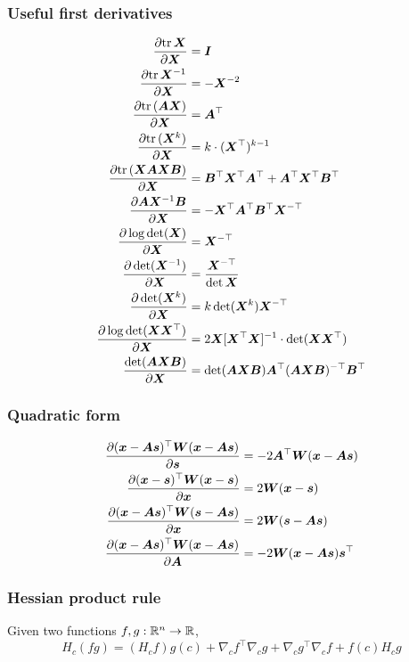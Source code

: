 \documentclass[10pt]{article}
\begin{document}
\subsubsection{Useful first derivatives}
\begin{align}
    \frac{\partial \mathrm{tr}\,{{\bm{X}}}}{\partial {\bm{X}}} &= {\bm{I}}  
\\
    \frac{\partial \mathrm{tr}\,{{\bm{X}}^{-1}}}{\partial {\bm{X}}} &= -{\bm{X}}^{-2} 
\\
\frac{\partial \mathrm{tr}\,({\bm{A}} {\bm{X}})}{\partial {\bm{X}}} &= {\bm{A}}^{\top}
\\
    \frac{\partial \mathrm{tr}\,( {\bm{X}}^k)}{\partial {\bm{X}}} &= {k \cdot ({\bm{X}}^{\top})^{k-1}}
\\
    \frac{\partial \mathrm{tr}\,( {\bm{X}} {\bm{A}} {\bm{X}} {\bm{B}})}{\partial {\bm{X}}} &= {\bm{B}}^{\top} {\bm{X}}^{\top} {\bm{A}}^{\top} + {\bm{A}}^{\top} {\bm{X}}^{\top} {\bm{B}}^{\top}
\\
\frac{\partial {\bm{A}} {\bm{X}}^{-1} {\bm{B}}}{\partial {\bm{X}}} &= - {\bm{X}}^{\top} {\bm{A}}^{\top} {\bm{B}}^{\top} {\bm{X}}^{-\top} 
\\ 
\frac{\partial \log \det ( {\bm{X}})}{\partial {\bm{X}}} &= {\bm{X}}^{- \top}
\\
    \frac{\partial \det({\bm{X}}^{-1})}{\partial {\bm{X}}} &= \frac{{\bm{X}}^{- \top}}{\det{{\bm{X}}}} 
\\ 
\frac{\partial \det({\bm{X}}^k)}{\partial {\bm{X}}} &= k \det({\bm{X}}^k) {\bm{X}}^{- \top} \\ 
\frac{\partial \log \det( {\bm{X}} {\bm{X}}^{\top})}{\partial {\bm{X}}} &= 2 {\bm{X}} [{\bm{X}}^{\top} {\bm{X}}]^{-1} \cdot \det({\bm{X}} {\bm{X}}^{\top}) 
\\ 
\frac{\det( {\bm{A}} {\bm{X}} {\bm{B}})}{\partial {\bm{X}}} &= \det({\bm{A}} {\bm{X}} {\bm{B}}) {\bm{A}}^{\top} ({\bm{A}} {\bm{X}} {\bm{B}})^{-\top} {\bm{B}}^{\top}
\end{align}
\subsubsection{Quadratic form}
\begin{align}
    \frac{\partial ({\bm{x}} - {\bm{A}} {\bm{s}})^{\top} {\bm{W}} ({\bm{x}} - {\bm{A}} {\bm{s}})}{\partial {\bm{s}}} &= - 2 {\bm{A}}^{\top} {\bm{W}} ({\bm{x}} - {\bm{A}} {\bm{s}}) \\
    \frac{\partial ({\bm{x}} - {\bm{s}})^{\top} {\bm{W}} ({\bm{x}} - {\bm{s}})}{\partial {\bm{x}}} &= 2 {\bm{W}} ({\bm{x}} - {\bm{s}}) \\ 
    \frac{\partial ({\bm{x}} - {\bm{A}} {\bm{s}})^{\top} {\bm{W}} ({\bm{s}} - {\bm{A}} {\bm{s}})}{\partial {\bm{x}}} &= 2 {\bm{W}} ({\bm{s}} - {\bm{A}} {\bm{s}}) \\
    \frac{\partial ({\bm{x}} - {\bm{A}} {\bm{s}})^{\top} {\bm{W}} ( {\bm{x}} - {\bm{A}} {\bm{s}})}{\partial {\bm{A}}} &= - 2 {\bm{W}} ({\bm{x}} - {\bm{A}} {\bm{s}}) {\bm{s}}^{\top}
\end{align}
\subsubsection{Hessian product rule}
Given two functions $f,g: \mathbb{R}^n \to \mathbb{R}$, 
\begin{equation}
    H_c (fg) = (H_c f) g(c) + \nabla_c f^{\top} \nabla_c g + \nabla_c g^{\top} \nabla_c f + f(c) H_c g
\end{equation}
\end{document}
